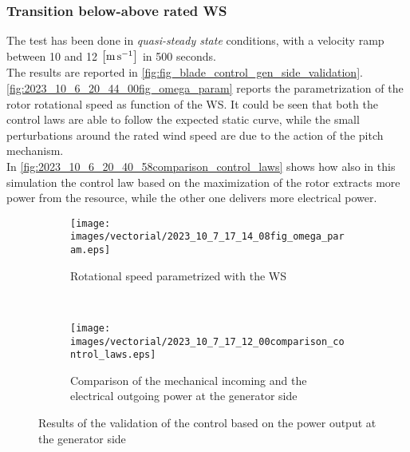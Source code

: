 \subsubsection{Transition below-above rated WS}
The test has been done in \textit{quasi-steady state} conditions, with a velocity ramp between 10 and 12 $\left[\si{\meter\per\second}\right]$ in 500 seconds.\\
The results are reported in \autoref{fig:fig_blade_control_gen_side_validation}. \autoref{fig:2023_10_6_20_44_00fig_omega_param} reports the parametrization of the rotor rotational speed as function of the WS. It could be seen that both the control laws are able to follow the expected static curve, while the small perturbations around the rated wind speed are due to the action of the pitch mechanism.\\
In \autoref{fig:2023_10_6_20_40_58comparison_control_laws} shows how also in this simulation the control law based on the maximization of the rotor extracts more power from the resource, while the other one delivers more electrical power.
\begin{center}
\begin{figure}[htb]
  \begin{subfigure}{\textwidth}
    \centering
    \texttt{[image: images/vectorial/2023\_10\_7\_17\_14\_08fig\_omega\_param.eps]}
    \caption{Rotational speed parametrized with the WS}
    \label{fig:2023_10_6_20_44_00fig_omega_param}
  \end{subfigure}
  \\
  \begin{subfigure}{\textwidth}
    \centering
    \texttt{[image: images/vectorial/2023\_10\_7\_17\_12\_00comparison\_control\_laws.eps]}
    \caption{Comparison of the mechanical incoming and the electrical outgoing power at the generator side}
    \label{fig:2023_10_6_20_40_58comparison_control_laws}
  \end{subfigure}
  \caption{Results of the validation of the control based on the power output at the generator side}
  \label{fig:fig_blade_control_gen_side_validation}
\end{figure}
\end{center}
\newpage